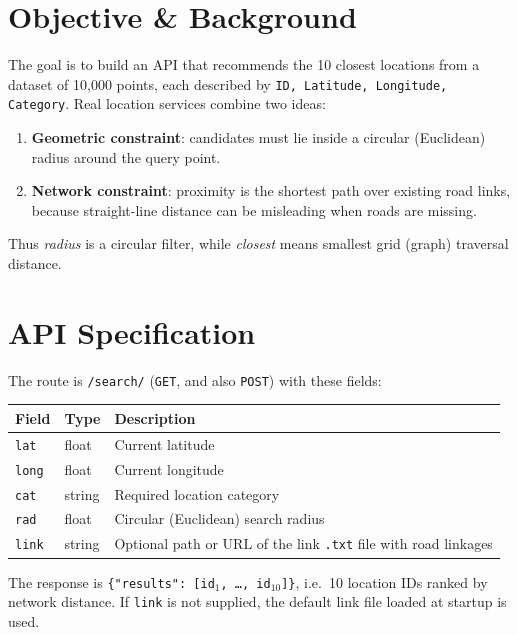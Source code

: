 \documentclass[11pt,a4paper]{article}
\begin{document}
\section{Objective \& Background}
The goal is to build an API that recommends the 10 closest locations from a dataset of 10,000 points, each described by \texttt{ID, Latitude, Longitude, Category}. Real location services combine two ideas:
\begin{enumerate}[label=\alph*), itemsep=1pt, topsep=2pt]
    \item \textbf{Geometric constraint}: candidates must lie inside a circular (Euclidean) radius around the query point.
    \item \textbf{Network constraint}: proximity is the shortest path over existing road links, because straight-line distance can be misleading when roads are missing.
\end{enumerate}
Thus \emph{radius} is a circular filter, while \emph{closest} means smallest grid (graph) traversal distance.

\section{API Specification}
The route is \texttt{/search/} (\texttt{GET}, and also \texttt{POST}) with these fields:
\begin{table}[H]
\centering
\small
\begin{tabular}{@{}llp{8.2cm}@{}}
\toprule
\textbf{Field} & \textbf{Type} & \textbf{Description} \\ \midrule
\texttt{lat}  & float  & Current latitude \\
\texttt{long} & float  & Current longitude \\
\texttt{cat}  & string & Required location category \\
\texttt{rad}  & float  & Circular (Euclidean) search radius \\
\texttt{link} & string & Optional path or URL of the link \texttt{.txt} file with road linkages \\ \bottomrule
\end{tabular}
\end{table}
The response is \texttt{\{"results": [id$_1$, \dots, id$_{10}$]\}}, i.e.\ 10 location IDs ranked by network distance. If \texttt{link} is not supplied, the default link file loaded at startup is used.
\end{document}
